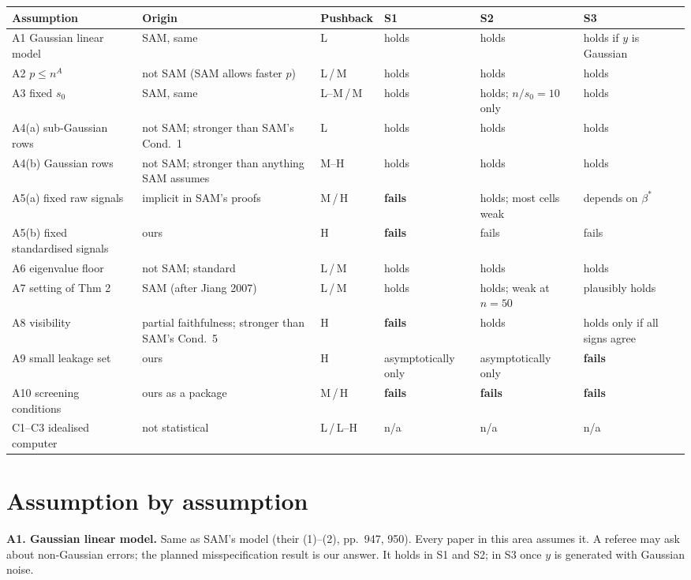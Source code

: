 \documentclass[11pt]{article}
\newcommand{\sz}{s_0}
\begin{document}
{\small
\begin{longtable}{@{}p{3.0cm}p{3.1cm}p{1.45cm}p{2.25cm}p{2.25cm}p{2.25cm}@{}}
\toprule
Assumption & Origin & Pushback & S1 & S2 & S3 \\
\midrule
\endhead
A1 Gaussian linear model & SAM, same & L & holds & holds & holds if $y$ is Gaussian \\
A2 $p\le n^A$ & not SAM (SAM allows faster $p$) & L\,/\,M & holds & holds & holds \\
A3 fixed $\sz$ & SAM, same & L--M\,/\,M & holds & holds; $n/\sz=10$ only & holds \\
A4(a) sub-Gaussian rows & not SAM; stronger than SAM's Cond.~1 & L & holds & holds & holds \\
A4(b) Gaussian rows & not SAM; stronger than anything SAM assumes & M--H & holds & holds & holds \\
A5(a) fixed raw signals & implicit in SAM's proofs & M\,/\,H & \textbf{fails} & holds; most cells weak & depends on $\beta^*$ \\
A5(b) fixed standardised signals & ours & H & \textbf{fails} & fails & fails \\
A6 eigenvalue floor & not SAM; standard & L\,/\,M & holds & holds & holds \\
A7 setting of Thm 2 & SAM (after Jiang 2007) & L\,/\,M & holds & holds; weak at $n=50$ & plausibly holds \\
A8 visibility & partial faithfulness; stronger than SAM's Cond.~5 & H & \textbf{fails} & holds & holds only if all signs agree \\
A9 small leakage set & ours & H & asymptotically only & asymptotically only & \textbf{fails} \\
A10 screening conditions & ours as a package & M\,/\,H & \textbf{fails} & \textbf{fails} & \textbf{fails} \\
C1--C3 idealised computer & not statistical & L\,/\,L--H & n/a & n/a & n/a \\
\bottomrule
\end{longtable}}

\section*{Assumption by assumption}

\textbf{A1. Gaussian linear model.} Same as SAM's model (their (1)--(2), pp.~947, 950). Every paper in this area
assumes it. A referee may ask about non-Gaussian errors; the planned misspecification result is our answer. It holds in
S1 and S2; in S3 once $y$ is generated with Gaussian noise.
\end{document}
